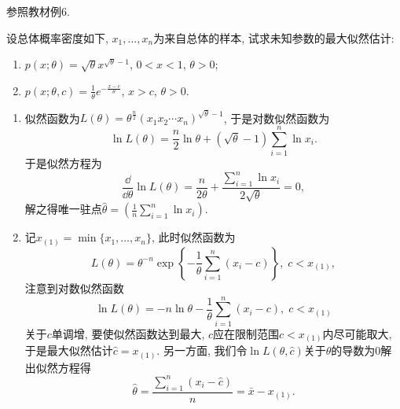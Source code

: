\documentclass[11pt]{ctexart}
\begin{document}
\begin{example}[均匀分布的最大似然估计]
	{\color{blue} 参照教材例6}. 
\end{example}

\begin{example}
	设总体概率密度如下, $x_1, \dots, x_n$为来自总体的样本, 试求未知参数的最大似然估计:
	\begin{enumerate}[label = (\arabic*)]
		\item $p(x;\theta) = \sqrt{\theta} x^{\sqrt{\theta} - 1}$, $0<x<1$, $\theta > 0$; 
		\item $p(x; \theta, c) = \frac{1}{\theta} e^{- \frac{x - c}{\theta}}$, $x > c$, $\theta > 0$. 
	\end{enumerate}
\end{example}
\begin{solution}
	\begin{enumerate}[label = (\arabic*)]
		\item 似然函数为$L(\theta) = \theta^{\frac{n}{2}} (x_1 x_2 \cdots x_n)^{\sqrt{\theta} - 1}$, 于是对数似然函数为
			\begin{equation*}
				\ln L(\theta) = \frac{n}{2} \ln \theta + (\sqrt{\theta} - 1) \sum_{i=1}^n \ln x_i.
			\end{equation*}
			于是似然方程为
			\begin{equation*}
				\frac{\dd}{\dd \theta} \ln L(\theta) = \frac{n}{2 \theta} + \frac{\sum_{i=1}^n \ln x_i}{2 \sqrt{\theta}} = 0, 
			\end{equation*}
			解之得唯一驻点$\displaystyle \hat \theta = \left( \frac{1}{n} \sum_{i=1}^n \ln x_i \right)$. 
		\item 记$x_{(1)} = \min\{x_1, \dots, x_n\}$, 此时似然函数为
			\begin{equation*}
				L(\theta) = \theta^{-n} \exp\left\{ -\frac{1}{\theta} \sum_{i=1}^n (x_i - c) \right\},\; c < x_{(1)}, 
			\end{equation*}
			注意到对数似然函数
			\begin{equation*}
				\ln L(\theta) = - n \ln \theta - \frac{1}{\theta} \sum_{i=1}^n (x_i - c),\; c < x_{(1)}
			\end{equation*}
			关于$c$单调增, 要使似然函数达到最大, $c$应在限制范围$c < x_{(1)}$内尽可能取大, 于是最大似然估计$\hat c = x_{(1)}$. 
			另一方面, 我们令$\ln L(\theta, \hat c)$关于$\theta$的导数为$0$解出似然方程得
			\begin{equation*}
				\hat \theta = \frac{\sum_{i=1}^n (x_i - \hat c)}{n} = \bar x - x_{(1)}.
			\end{equation*}
	\end{enumerate}
\end{solution}
\end{document}

